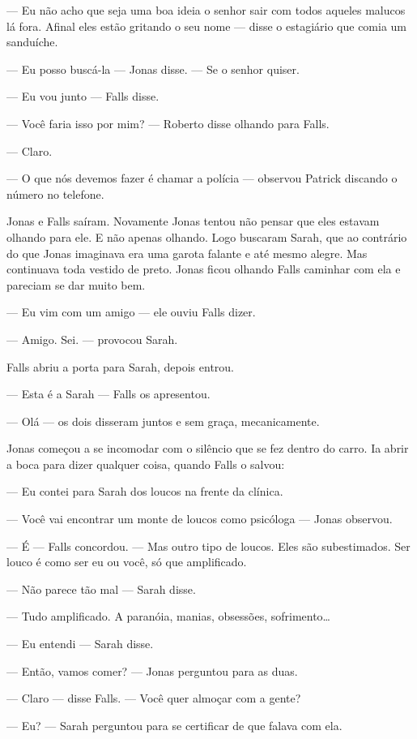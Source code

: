 --- Eu não acho que seja uma boa ideia o senhor sair com todos aqueles malucos lá fora. Afinal eles estão gritando o seu nome --- disse o estagiário que comia um sanduíche.

--- Eu posso buscá-la --- Jonas disse. --- Se o senhor quiser.

--- Eu vou junto --- Falls disse.

--- Você faria isso por mim? --- Roberto disse olhando para Falls.

--- Claro.

--- O que nós devemos fazer é chamar a polícia --- observou Patrick discando o número no telefone.

Jonas e Falls saíram. Novamente Jonas tentou não pensar que eles estavam olhando para ele. E não apenas olhando. Logo buscaram Sarah, que ao contrário do que Jonas imaginava era uma garota falante e até mesmo alegre. Mas continuava toda vestido de preto. Jonas ficou olhando Falls caminhar com ela e pareciam se dar muito bem.

--- Eu vim com um amigo --- ele ouviu Falls dizer.

--- Amigo. Sei. --- provocou Sarah.

Falls abriu a porta para Sarah, depois entrou.

--- Esta é a Sarah --- Falls os apresentou.

--- Olá --- os dois disseram juntos e sem graça, mecanicamente.

Jonas começou a se incomodar com o silêncio que se fez dentro do carro. Ia abrir a boca para dizer qualquer coisa, quando Falls o salvou:

--- Eu contei para Sarah dos loucos na frente da clínica.

--- Você vai encontrar um monte de loucos como psicóloga --- Jonas observou.

--- É --- Falls concordou. --- Mas outro tipo de loucos. Eles são subestimados. Ser louco é como ser eu ou você, só que amplificado.

--- Não parece tão mal --- Sarah disse.

--- Tudo amplificado. A paranóia, manias, obsessões, sofrimento\ldots

--- Eu entendi --- Sarah disse.

--- Então, vamos comer? --- Jonas perguntou para as duas.

--- Claro --- disse Falls. --- Você quer almoçar com a gente?

--- Eu? --- Sarah perguntou para se certificar de que falava com ela.

